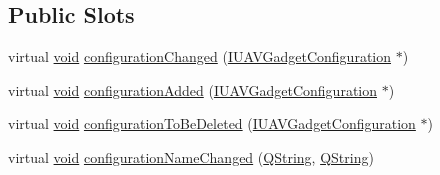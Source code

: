\subsection*{\-Public \-Slots}
\begin{DoxyCompactItemize}
\item 
virtual \hyperlink{group___u_a_v_objects_plugin_ga444cf2ff3f0ecbe028adce838d373f5c}{void} \hyperlink{group___core_plugin_ga4a76f276d67023d53ca8a5338af10634}{configuration\-Changed} (\hyperlink{class_core_1_1_i_u_a_v_gadget_configuration}{\-I\-U\-A\-V\-Gadget\-Configuration} $\ast$)
\item 
virtual \hyperlink{group___u_a_v_objects_plugin_ga444cf2ff3f0ecbe028adce838d373f5c}{void} \hyperlink{group___core_plugin_ga8234e97e94558cdd2ee137db82925693}{configuration\-Added} (\hyperlink{class_core_1_1_i_u_a_v_gadget_configuration}{\-I\-U\-A\-V\-Gadget\-Configuration} $\ast$)
\item 
virtual \hyperlink{group___u_a_v_objects_plugin_ga444cf2ff3f0ecbe028adce838d373f5c}{void} \hyperlink{group___core_plugin_ga7810dea18c37e2ec2588adfed05701f0}{configuration\-To\-Be\-Deleted} (\hyperlink{class_core_1_1_i_u_a_v_gadget_configuration}{\-I\-U\-A\-V\-Gadget\-Configuration} $\ast$)
\item 
virtual \hyperlink{group___u_a_v_objects_plugin_ga444cf2ff3f0ecbe028adce838d373f5c}{void} \hyperlink{group___core_plugin_ga9fa66647624ca42689597cac1716be5a}{configuration\-Name\-Changed} (\hyperlink{group___u_a_v_objects_plugin_gab9d252f49c333c94a72f97ce3105a32d}{\-Q\-String}, \hyperlink{group___u_a_v_objects_plugin_gab9d252f49c333c94a72f97ce3105a32d}{\-Q\-String})
\end{DoxyCompactItemize}
